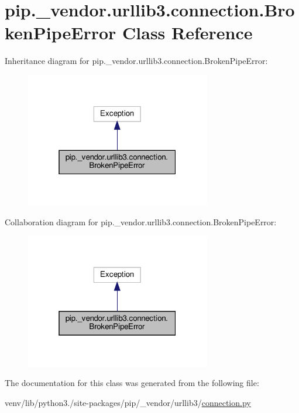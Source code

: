 \hypertarget{classpip_1_1__vendor_1_1urllib3_1_1connection_1_1BrokenPipeError}{}\section{pip.\+\_\+vendor.\+urllib3.\+connection.\+Broken\+Pipe\+Error Class Reference}
\label{classpip_1_1__vendor_1_1urllib3_1_1connection_1_1BrokenPipeError}


Inheritance diagram for pip.\+\_\+vendor.\+urllib3.\+connection.\+Broken\+Pipe\+Error\+:
\nopagebreak
\begin{figure}[H]
\begin{center}
\leavevmode
\includegraphics[width=229pt]{classpip_1_1__vendor_1_1urllib3_1_1connection_1_1BrokenPipeError__inherit__graph}
\end{center}
\end{figure}


Collaboration diagram for pip.\+\_\+vendor.\+urllib3.\+connection.\+Broken\+Pipe\+Error\+:
\nopagebreak
\begin{figure}[H]
\begin{center}
\leavevmode
\includegraphics[width=229pt]{classpip_1_1__vendor_1_1urllib3_1_1connection_1_1BrokenPipeError__coll__graph}
\end{center}
\end{figure}


The documentation for this class was generated from the following file\+:\begin{DoxyCompactItemize}
\item 
venv/lib/python3./site-\/packages/pip/\+\_\+vendor/urllib3/\hyperlink{connection_8py}{connection.\+py}\end{DoxyCompactItemize}
